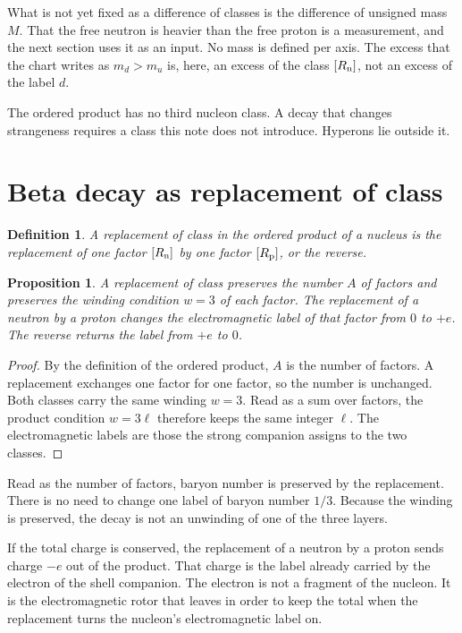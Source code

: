 \documentclass[a4paper]{article}
\newtheorem{proposition}[lemma]{Proposition}
\newtheorem{definition}[lemma]{Definition}
\begin{document}
What is not yet fixed as a difference of classes is the difference of unsigned mass \(M\). That the free neutron is heavier than the free proton is a measurement, and the next section uses it as an input. No mass is defined per axis. The excess that the chart writes as \(m_d>m_u\) is, here, an excess of the class \([R_{\rm n}]\), not an excess of the label \(d\).

The ordered product has no third nucleon class. A decay that changes strangeness requires a class this note does not introduce. Hyperons lie outside it.

\section{Beta decay as replacement of class}
\label{sec:decay}

\begin{definition}
\label{def:replacement}
A \emph{replacement of class} in the ordered product of a nucleus is the replacement of one factor \([R_{\rm n}]\) by one factor \([R_{\rm p}]\), or the reverse.
\end{definition}

\begin{proposition}
\label{prop:conserved}
A replacement of class preserves the number \(A\) of factors and preserves the winding condition \(w=3\) of each factor. The replacement of a neutron by a proton changes the electromagnetic label of that factor from \(0\) to \(+e\). The reverse returns the label from \(+e\) to \(0\).
\end{proposition}

\begin{proof}
By the definition of the ordered product, \(A\) is the number of factors. A replacement exchanges one factor for one factor, so the number is unchanged. Both classes carry the same winding \(w=3\). Read as a sum over factors, the product condition \(w=3\ell\) therefore keeps the same integer \(\ell\). The electromagnetic labels are those the strong companion assigns to the two classes.
\end{proof}

Read as the number of factors, baryon number is preserved by the replacement. There is no need to change one label of baryon number \(1/3\). Because the winding is preserved, the decay is not an unwinding of one of the three layers.

If the total charge is conserved, the replacement of a neutron by a proton sends charge \(-e\) out of the product. That charge is the label already carried by the electron of the shell companion. The electron is not a fragment of the nucleon. It is the electromagnetic rotor that leaves in order to keep the total when the replacement turns the nucleon's electromagnetic label on.
\end{document}
